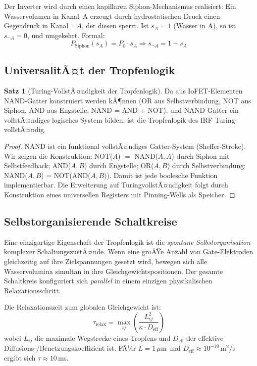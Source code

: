﻿\documentclass[a4paper,12pt]{scrreprt}
\theoremstyle{definition}
\newtheorem{satz}{Satz}[section]
\begin{document}
Der Inverter wird durch einen kapillaren Siphon-Mechanismus realisiert:
Ein Wasservolumen in Kanal~A erzeugt durch hydrostatischen Druck einen
Gegendruck in Kanal~$\neg A$, der diesen sperrt. Ist $s_A = 1$ (Wasser
in A), so ist $s_{\neg A} = 0$, und umgekehrt. Formal:
\begin{equation}
	P_{\mathrm{Siphon}}(s_A) = P_0 \cdot s_A \Rightarrow s_{\neg A} = 1 - s_A
	\label{eq:not_gatter}
\end{equation}

\subsection{UniversalitÃ¤t der Tropfenlogik}

\begin{satz}[Turing-VollstÃ¤ndigkeit der Tropfenlogik]
	Da aus IoFET-Elementen NAND-Gatter konstruiert werden kÃ¶nnen (OR aus
	Selbstverbindung, NOT aus Siphon, AND aus Engstelle, NAND = AND + NOT),
	und NAND-Gatter ein vollstÃ¤ndiges logisches System bilden, ist die
	Tropfenlogik des IRF Turing-vollstÃ¤ndig.
\end{satz}

\begin{proof}
	NAND ist ein funktional vollstÃ¤ndiges Gatter-System (Sheffer-Stroke).
	Wir zeigen die Konstruktion: NOT($A$) $=$ NAND($A, A$) durch Siphon mit
	Selbstfeedback; AND($A, B$) durch Engstelle; OR($A, B$) durch Selbstverbindung;
	NAND($A, B$) = NOT(AND($A, B$)). Damit ist jede boolesche Funktion
	implementierbar. Die Erweiterung auf TuringvollstÃ¤ndigkeit folgt durch
	Konstruktion eines universellen Registers mit Pinning-Wells als Speicher.
\end{proof}

\subsection{Selbstorganisierende Schaltkreise}

Eine einzigartige Eigenschaft der Tropfenlogik ist die \emph{spontane
	Selbstorganisation} komplexer SchaltungszustÃ¤nde. Wenn eine groÃŸe Anzahl
von Gate-Elektroden gleichzeitig auf ihre Zielspannungen gesetzt wird,
bewegen sich alle Wasservolumina simultan in ihre Gleichgewichtspositionen.
Der gesamte Schaltkreis konfiguriert sich \emph{parallel} in einem einzigen
physikalischen Relaxationsschritt.

Die Relaxationszeit zum globalen Gleichgewicht ist:
\begin{equation}
	\tau_{\mathrm{relax}} = \max_{ij} \left( \frac{L_{ij}^2}{\kappa \cdot D_{\mathrm{eff}}} \right)
	\label{eq:relaxationszeit}
\end{equation}
wobei $L_{ij}$ die maximale Wegstrecke eines Tropfens und $D_{\mathrm{eff}}$ der
effektive Diffusions-/Benetzungskoeffizient ist. FÃ¼r $L = 1\,\mu$m und
$D_{\mathrm{eff}} \approx 10^{-10}$\,m$^2$/s ergibt sich $\tau \approx 10$\,ms.
\end{document}

